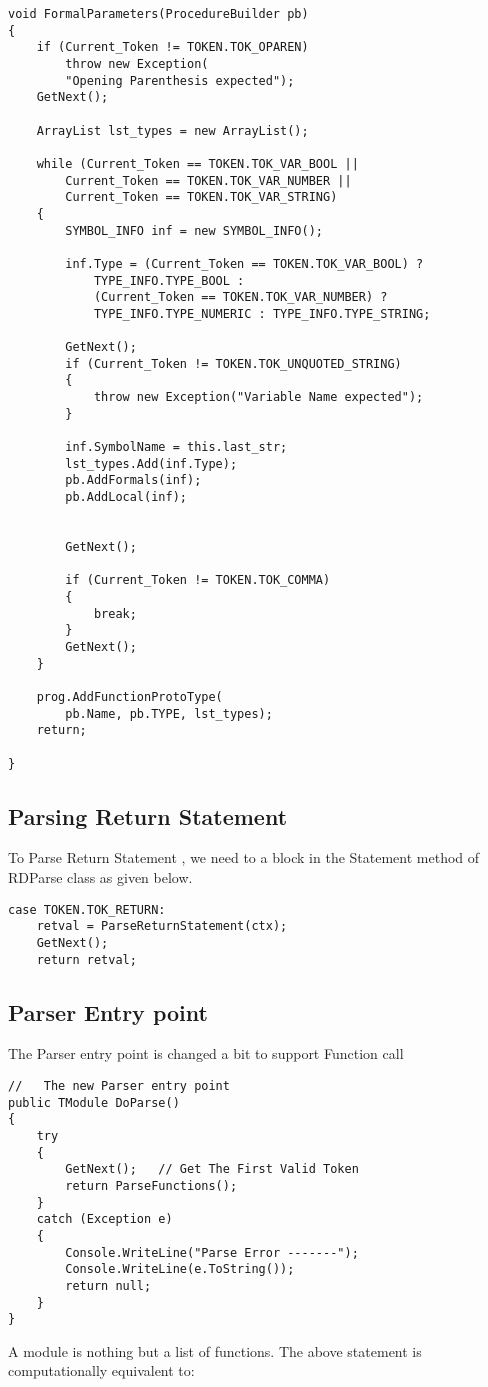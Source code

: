 \lstset{style=csharp}
\begin{lstlisting}
void FormalParameters(ProcedureBuilder pb)
{
    if (Current_Token != TOKEN.TOK_OPAREN)
        throw new Exception(
		"Opening Parenthesis expected");
    GetNext();

    ArrayList lst_types = new ArrayList();

    while (Current_Token == TOKEN.TOK_VAR_BOOL ||
        Current_Token == TOKEN.TOK_VAR_NUMBER ||
        Current_Token == TOKEN.TOK_VAR_STRING)
    {
        SYMBOL_INFO inf = new SYMBOL_INFO();

        inf.Type = (Current_Token == TOKEN.TOK_VAR_BOOL) ?
            TYPE_INFO.TYPE_BOOL : 
			(Current_Token == TOKEN.TOK_VAR_NUMBER) ?
            TYPE_INFO.TYPE_NUMERIC : TYPE_INFO.TYPE_STRING;

        GetNext();
        if (Current_Token != TOKEN.TOK_UNQUOTED_STRING)
        {
            throw new Exception("Variable Name expected");
        }

        inf.SymbolName = this.last_str;
        lst_types.Add(inf.Type);
        pb.AddFormals(inf);
        pb.AddLocal(inf);


        GetNext();

        if (Current_Token != TOKEN.TOK_COMMA)
        {
            break;
        }
        GetNext();
    }

    prog.AddFunctionProtoType(
		pb.Name, pb.TYPE, lst_types);
    return;

}
\end{lstlisting}
\subsection{Parsing Return Statement}
To Parse Return Statement , we need to a block in the Statement method of RDParse class
as given below.
\lstset{style=csharp}
\begin{lstlisting}
case TOKEN.TOK_RETURN:
	retval = ParseReturnStatement(ctx);
	GetNext();
	return retval;
\end{lstlisting}

\subsection{Parser Entry point}
The Parser entry point is changed a bit to support Function call
\lstset{style=csharp}
\begin{lstlisting}
//   The new Parser entry point
public TModule DoParse()
{
    try
    {
        GetNext();   // Get The First Valid Token
        return ParseFunctions();
    }
    catch (Exception e)
    {
        Console.WriteLine("Parse Error -------");
        Console.WriteLine(e.ToString());
        return null;
    }
}
\end{lstlisting}
A module is nothing but a list of functions. The above statement is computationally equivalent to:

